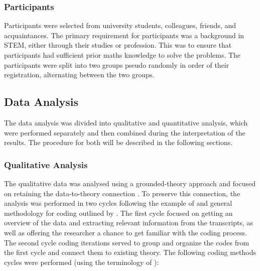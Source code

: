 \subsubsection{Participants} \label{sssec:participants}

Participants were selected from university students, colleagues, friends, and acquaintances. The primary requirement for participants was a background in \ac{STEM}, either through their studies or profession. This was to ensure that participants had sufficient prior maths knowledge to solve the problems. The participants were split into two groups pseudo randomly in order of their registration, alternating between the two groups.

\subsection{Data Analysis} \label{ssec:data_analysis}

The data analysis was divided into qualitative and quantitative analysis, which were performed separately and then combined during the interpretation of the results. The procedure for both will be described in the following sections.

\subsubsection{Qualitative Analysis} \label{sssec:qualitative_analysis}

The qualitative data was analysed using a grounded-theory approach and focused on retaining the data-to-theory connection \parencite{Gioia2021}. To preserve this connection, the analysis was performed in two cycles following the example of \cite{Jussupow2021} and general methodology for coding outlined by \cite{Saldana2015}. The first cycle focused on getting an overview of the data and extracting relevant information from the transcripts, as well as offering the researcher a chance to get familiar with the coding process. The second cycle coding iterations served to group and organize the codes from the first cycle and connect them to existing theory. The following coding methods cycles were performed (using the terminology of \cite{Saldana2015}):

